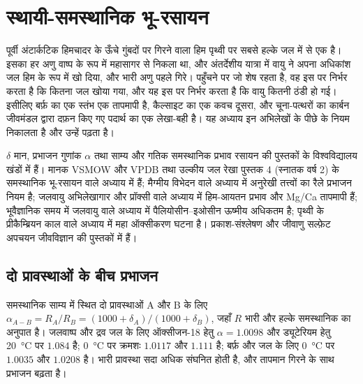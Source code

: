 \chapter{स्थायी-समस्थानिक भू-रसायन}\label{ch:b3:stable-isotopes}

पूर्वी अंटार्कटिक हिमचादर के ऊँचे गुंबदों पर गिरने वाला हिम पृथ्वी पर
सबसे हल्के जल में से एक है। इसका हर अणु वाष्प के रूप में महासागर से निकला था, और
अंतर्देशीय यात्रा में वायु ने अपना अधिकांश जल हिम के रूप में खो दिया, और भारी
अणु पहले गिरे। पहुँचने पर जो शेष रहता है, वह इस पर निर्भर करता है कि कितना
जल खोया गया, और यह इस पर निर्भर करता है कि वायु कितनी ठंडी हो गई। इसीलिए
बर्फ़ का एक स्तंभ एक तापमापी है, कैल्साइट का एक कवच दूसरा, और चूना-पत्थरों का
कार्बन जीवमंडल द्वारा दफ़न किए गए पदार्थ का एक लेखा-बही है। यह अध्याय इन
अभिलेखों के पीछे के नियम निकालता है और उन्हें पढ़ता है।

\begin{recall}
$\delta$ मान, प्रभाजन गुणांक $\alpha$ तथा साम्य और गतिक समस्थानिक
प्रभाव रसायन की पुस्तकों के विश्वविद्यालय खंडों में हैं। मानक VSMOW और VPDB
तथा उल्कीय जल रेखा पुस्तक 4 (स्नातक वर्ष 2) के समस्थानिक भू-रसायन वाले
अध्याय में हैं; मैग्मीय विभेदन वाले अध्याय में
अनुरेखी तत्त्वों का रैले प्रभाजन नियम है;
जलवायु अभिलेखागार और प्रॉक्सी वाले अध्याय में हिम-आयतन प्रभाव और Mg/Ca
तापमापी हैं; भूवैज्ञानिक समय में जलवायु वाले अध्याय में पैलियोसीन--इओसीन
ऊष्मीय अधिकतम है; पृथ्वी के प्रीकैम्ब्रियन काल वाले अध्याय में महा ऑक्सीकरण
घटना है।
प्रकाश-संश्लेषण और जीवाणु सल्फ़ेट अपचयन जीवविज्ञान की पुस्तकों में हैं।
\end{recall}

\section{दो प्रावस्थाओं के बीच प्रभाजन}\label{sec:b3:stable-isotopes:fractionation}

समस्थानिक साम्य में स्थित दो प्रावस्थाओं A और B के लिए $\alpha_{A-B} = R_A/R_B =
(1000 + \delta_A)/(1000 + \delta_B)$, जहाँ $R$ भारी और हल्के समस्थानिक का अनुपात है।
जलवाष्प और द्रव जल के लिए ऑक्सीजन-18 हेतु $\alpha = 1.0098$ और
ड्यूटेरियम हेतु \qty{20}{\celsius} पर $1.084$ है; \qty{0}{\celsius} पर क्रमशः
$1.0117$ और $1.111$ है; बर्फ़ और जल के लिए \qty{0}{\celsius} पर $1.0035$ और $1.0208$ है।
भारी प्रावस्था सदा अधिक संघनित होती है, और
तापमान गिरने के साथ प्रभाजन बढ़ता है।

